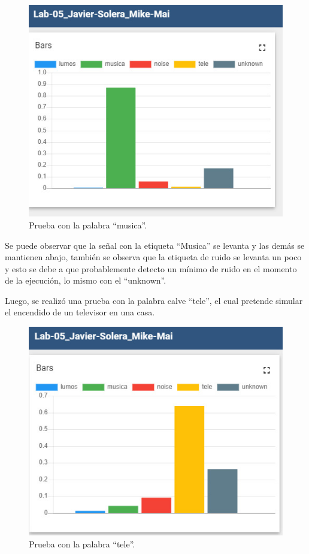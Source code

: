 \begin{figure}[H]
    \centering
    \includegraphics[width=\textwidth]{Imagenes/musica.jpg}
    \caption{Prueba con la palabra ``musica''.}
    \label{Musica}
\end{figure}

Se puede observar que la señal con la etiqueta ``Musica'' se levanta y las demás se mantienen abajo, también se observa que la etiqueta de ruido se levanta un poco y esto se debe a que probablemente detecto un mínimo de ruido en el momento de la ejecución, lo mismo con el ``unknown''.

Luego, se realizó una prueba con la palabra calve ``tele'', el cual pretende simular el encendido de un televisor en una casa.

\begin{figure}[H]
    \centering
    \includegraphics[width=\textwidth]{Imagenes/tele.jpg}
    \caption{Prueba con la palabra ``tele''.}
    \label{tele}
\end{figure}

